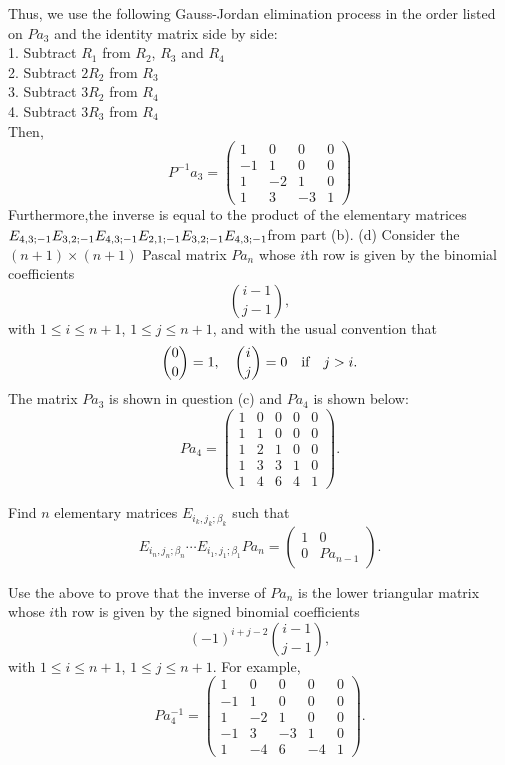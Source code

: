 \documentclass[12pt]{article}
\begin{document}
Thus, we use the following Gauss-Jordan elimination process in the order listed on $Pa_3$ and the identity matrix side by side:\\
1. Subtract $R_1$ from $R_2$, $R_3$ and $R_4$\\
2. Subtract $2 R_2$ from $R_3$\\
3. Subtract $3 R_2$ from $R_4$\\
4. Subtract $3 R_3$ from $R_4$\\
Then, $$P^{-1}a_3 = \begin{pmatrix}
1 & 0 & 0 & 0\\-1 & 1 & 0 & 0 \\1 & -2 & 1 & 0\\1 & 3 & -3 & 1
\end{pmatrix}$$ 
Furthermore,the inverse is equal to the product of the elementary matrices $
E_{4, 3; -1} E_{3, 2; -1} E_{4, 3; -1}\\ E_{2, 1; -1} E_{3, 2; -1} E_{4, 3; -1}
$from part (b).
\medskip
(d)
Consider the $(n+1)\times (n+1)$ Pascal matrix $Pa_{n}$
whose $i$th row is given by the binomial coefficients
\[
\binom{i-1}{j-1},
\]
with $1 \leq i \leq n + 1$, $1 \leq j \leq n + 1$,
and with the usual convention that
\[
\binom{0}{0} = 1, \quad \binom{i}{j} = 0 
\quad\hbox{if}\quad j > i.
\]
The matrix $Pa_3$ is shown in question (c) and $Pa_4$ is shown below:
\[
Pa_4 = 
\begin{pmatrix}
1 & 0 & 0 & 0 & 0\\
1 & 1 & 0 & 0 & 0 \\
1 & 2 & 1 & 0 & 0 \\
1 & 3 & 3 & 1 & 0 \\
1 & 4 & 6 & 4 & 1
\end{pmatrix}.
\]

Find $n$ elementary matrices $E_{i_k, j_k; \beta_k}$ such that
\[
E_{i_n, j_n; \beta_n} \cdots E_{i_1, j_1; \beta_1} Pa_n = 
\begin{pmatrix}
1 & 0 \\
0 & Pa_{n - 1}
\end{pmatrix}.
\]

Use the above to prove that the inverse of $Pa_n$ is the lower
triangular matrix whose $i$th row is given by the signed binomial
coefficients
\[
(-1)^{i + j - 2}\binom{i-1}{j-1},
\]
with $1 \leq i \leq n + 1$, $1 \leq j \leq n + 1$.
For example,
\[
Pa_4^{-1} = 
\begin{pmatrix}
1 & 0 & 0 & 0 & 0\\
-1 & 1 & 0 & 0 & 0 \\
1 & -2 & 1 & 0 & 0 \\
-1 & 3 & -3 & 1 & 0 \\
1 & -4 & 6 & -4 & 1
\end{pmatrix}.
\]
\end{document}
